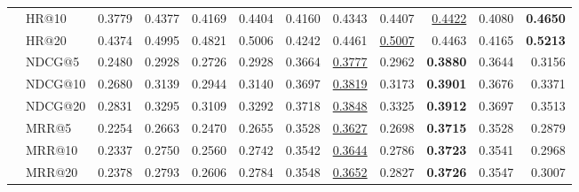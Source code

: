 \begin{tabular}{llrrrrrrrrrr}
 & HR@10 & 0.3779 & 0.4377 & 0.4169 & 0.4404 & 0.4160 & 0.4343 & 0.4407 & \underline{0.4422} & 0.4080 & \textbf{0.4650} \\
 & HR@20 & 0.4374 & 0.4995 & 0.4821 & 0.5006 & 0.4242 & 0.4461 & \underline{0.5007} & 0.4463 & 0.4165 & \textbf{0.5213} \\
 & NDCG@5 & 0.2480 & 0.2928 & 0.2726 & 0.2928 & 0.3664 & \underline{0.3777} & 0.2962 & \textbf{0.3880} & 0.3644 & 0.3156 \\
 & NDCG@10 & 0.2680 & 0.3139 & 0.2944 & 0.3140 & 0.3697 & \underline{0.3819} & 0.3173 & \textbf{0.3901} & 0.3676 & 0.3371 \\
 & NDCG@20 & 0.2831 & 0.3295 & 0.3109 & 0.3292 & 0.3718 & \underline{0.3848} & 0.3325 & \textbf{0.3912} & 0.3697 & 0.3513 \\
 & MRR@5 & 0.2254 & 0.2663 & 0.2470 & 0.2655 & 0.3528 & \underline{0.3627} & 0.2698 & \textbf{0.3715} & 0.3528 & 0.2879 \\
 & MRR@10 & 0.2337 & 0.2750 & 0.2560 & 0.2742 & 0.3542 & \underline{0.3644} & 0.2786 & \textbf{0.3723} & 0.3541 & 0.2968 \\
 & MRR@20 & 0.2378 & 0.2793 & 0.2606 & 0.2784 & 0.3548 & \underline{0.3652} & 0.2827 & \textbf{0.3726} & 0.3547 & 0.3007 \\
\hline
\end{tabular}
